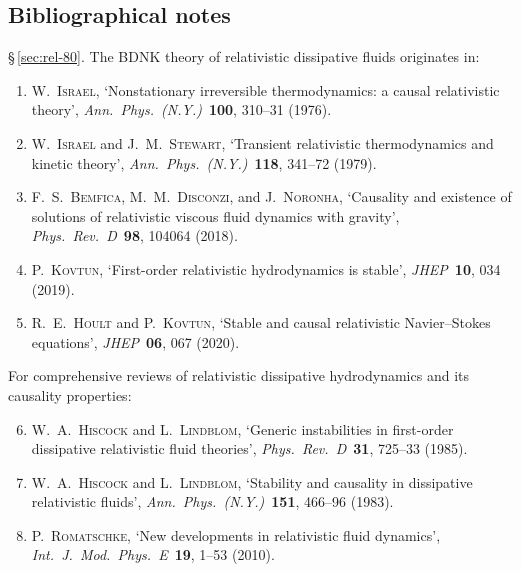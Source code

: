 \subsection*{Bibliographical notes}\label{sec:rel-80-bib}

\noindent\S\,\ref{sec:rel-80}.
The BDNK theory of relativistic dissipative fluids
originates in:

\begin{enumerate}
\item W.~\textsc{Israel}, `Nonstationary irreversible thermodynamics:
  a causal relativistic theory',
  \emph{Ann.\ Phys.\ (N.Y.)}\ \textbf{100}, 310--31 (1976).

\item W.~\textsc{Israel} and J.~M.~\textsc{Stewart},
  `Transient relativistic thermodynamics and kinetic theory',
  \emph{Ann.\ Phys.\ (N.Y.)}\ \textbf{118}, 341--72 (1979).

\item F.~S.~\textsc{Bemfica}, M.~M.~\textsc{Disconzi},
  and J.~\textsc{Noronha},
  `Causality and existence of solutions of relativistic viscous
  fluid dynamics with gravity',
  \emph{Phys.\ Rev.\ D}\ \textbf{98}, 104064 (2018).

\item P.~\textsc{Kovtun},
  `First-order relativistic hydrodynamics is stable',
  \emph{JHEP}\ \textbf{10}, 034 (2019).

\item R.~E.~\textsc{Hoult} and P.~\textsc{Kovtun},
  `Stable and causal relativistic Navier--Stokes equations',
  \emph{JHEP}\ \textbf{06}, 067 (2020).
\end{enumerate}

\noindent For comprehensive reviews of relativistic dissipative
hydrodynamics and its causality properties:

\begin{enumerate}\setcounter{enumi}{5}
\item W.~A.~\textsc{Hiscock} and L.~\textsc{Lindblom},
  `Generic instabilities in first-order dissipative relativistic
  fluid theories',
  \emph{Phys.\ Rev.\ D}\ \textbf{31}, 725--33 (1985).

\item W.~A.~\textsc{Hiscock} and L.~\textsc{Lindblom},
  `Stability and causality in dissipative relativistic fluids',
  \emph{Ann.\ Phys.\ (N.Y.)}\ \textbf{151}, 466--96 (1983).

\item P.~\textsc{Romatschke},
  `New developments in relativistic fluid dynamics',
  \emph{Int.\ J.\ Mod.\ Phys.\ E}\ \textbf{19}, 1--53 (2010).
\end{enumerate}

